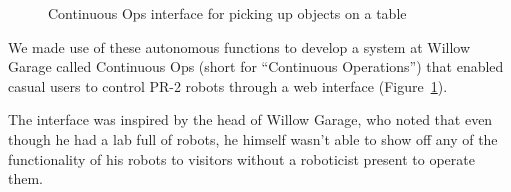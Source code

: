 \documentclass[10pt,twocolumn]{article}
\begin{document}

\begin{figure}[tbh]
\center{}
\caption{Continuous Ops interface for picking up objects on a table}
\label{contops}
\end{figure}

We made use of these autonomous functions to develop a system at Willow Garage called Continuous Ops (short for ``Continuous Operations'') that enabled casual users to control PR-2 robots through a web interface (Figure~\ref{contops}).
\begin{changebar}
The interface was inspired by the head of Willow Garage, who noted that even though he had a lab full of robots, he himself wasn't able to show off any of the functionality of his robots to visitors without a roboticist present to operate them.
\end{changebar}
\end{document}
